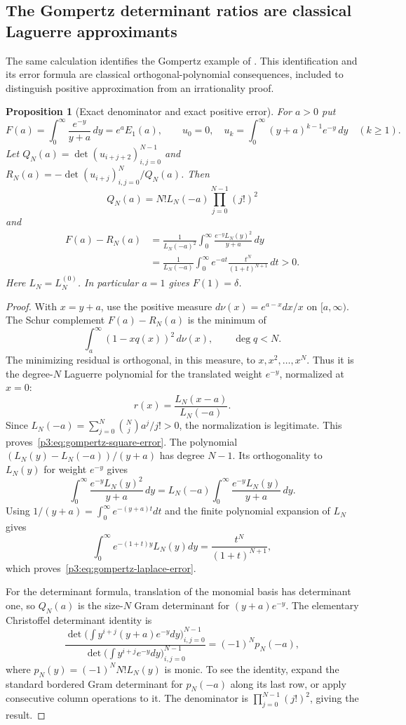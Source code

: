 \documentclass[11pt,a4paper]{article}
\newtheorem{proposition}[theorem]{Proposition}
\theoremstyle{definition}
\theoremstyle{remark}
\numberwithin{equation}{section}
\begin{document}
\subsection{The Gompertz determinant ratios are classical Laguerre approximants}

The same calculation identifies the Gompertz example of
\cite[Section~2]{p3:Ferguson2020}. This identification and its error
formula are classical orthogonal-polynomial consequences, included
to distinguish positive approximation from an irrationality proof.

\begin{proposition}[Exact denominator and exact positive error]
\label{p3:prop:gompertz-laguerre}
For $a>0$ put
\[
 F(a)=\int_0^\infty\frac{e^{-y}}{y+a}\,dy=e^aE_1(a),\qquad
 u_0=0,\quad
 u_k=\int_0^\infty(y+a)^{k-1}e^{-y}\,dy\quad(k\ge1).
\]
Let $Q_N(a)=\det(u_{i+j+2})_{i,j=0}^{N-1}$ and
$R_N(a)=-\det(u_{i+j})_{i,j=0}^{N}/Q_N(a)$. Then
\[
 Q_N(a)=N!L_N(-a)\prod_{j=0}^{N-1}(j!)^2
\]
and
\begin{align}
 F(a)-R_N(a)
 &=\frac1{L_N(-a)^2}
   \int_0^\infty\frac{e^{-y}L_N(y)^2}{y+a}\,dy\label{p3:eq:gompertz-square-error}\\
 &=\frac1{L_N(-a)}
   \int_0^\infty e^{-at}\frac{t^N}{(1+t)^{N+1}}\,dt>0.
 \label{p3:eq:gompertz-laplace-error}
\end{align}
Here $L_N=L_N^{(0)}$. In particular $a=1$ gives $F(1)=\delta$.
\end{proposition}

\begin{proof}
With $x=y+a$, use the positive measure
$d\nu(x)=e^{a-x}dx/x$ on $[a,\infty)$. The Schur complement
$F(a)-R_N(a)$ is the minimum of
\[
 \int_a^\infty(1-xq(x))^2\,d\nu(x),\qquad \deg q<N.
\]
The minimizing residual is orthogonal, in this measure, to
$x,x^2,\ldots,x^N$. Thus it is the degree-$N$ Laguerre polynomial
for the translated weight $e^{-y}$, normalized at $x=0$:
\[
 r(x)=\frac{L_N(x-a)}{L_N(-a)}.
\]
Since $L_N(-a)=\sum_{j=0}^N\binom Nj a^j/j!>0$, the normalization
is legitimate. This proves~\eqref{p3:eq:gompertz-square-error}.
The polynomial $(L_N(y)-L_N(-a))/(y+a)$ has degree $N-1$.
Its orthogonality to $L_N(y)$ for weight $e^{-y}$ gives
\[
 \int_0^\infty\frac{e^{-y}L_N(y)^2}{y+a}\,dy
 =L_N(-a)\int_0^\infty\frac{e^{-y}L_N(y)}{y+a}\,dy.
\]
Using $1/(y+a)=\int_0^\infty e^{-(y+a)t}dt$ and the finite
polynomial expansion of $L_N$ gives
\[
 \int_0^\infty e^{-(1+t)y}L_N(y)dy
 =\frac{t^N}{(1+t)^{N+1}},
\]
which proves~\eqref{p3:eq:gompertz-laplace-error}.

For the determinant formula, translation of the monomial basis has
determinant one, so $Q_N(a)$ is the size-$N$ Gram determinant for
$(y+a)e^{-y}$. The elementary Christoffel determinant identity is
\[
 \frac{\det\bigl(\int y^{i+j}(y+a)e^{-y}dy\bigr)_{i,j=0}^{N-1}}
 {\det\bigl(\int y^{i+j}e^{-y}dy\bigr)_{i,j=0}^{N-1}}
 =(-1)^Np_N(-a),
\]
where $p_N(y)=(-1)^NN!L_N(y)$ is monic. To see the identity,
expand the standard bordered Gram determinant for $p_N(-a)$
along its last row, or apply consecutive column operations to it.
The denominator is $\prod_{j=0}^{N-1}(j!)^2$, giving the result.
\end{proof}
\end{document}
